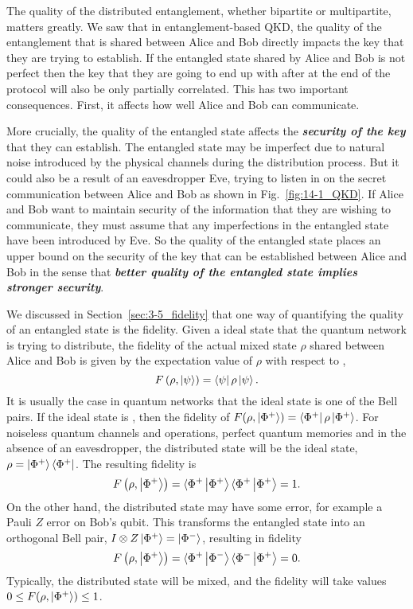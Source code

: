 The quality of the distributed entanglement, whether bipartite or multipartite, matters greatly.
We saw that in entanglement-based QKD, the quality of the entanglement that is shared between Alice and Bob directly impacts the key that they are trying to establish.
If the entangled state shared by Alice and Bob is not perfect then the key that they are going to end up with after at the end of the protocol will also be only partially correlated.
This has two important consequences.
First, it affects how well Alice and Bob can communicate.

More crucially, the quality of the entangled state affects the \textit{\textbf{security of the key}} that they can establish.
The entangled state may be imperfect due to natural noise introduced by the physical channels during the distribution process.
But it could also be a result of an eavesdropper Eve, trying to listen in on the secret communication between Alice and Bob as shown in Fig.~\ref{fig:14-1_QKD}.
If Alice and Bob want to maintain security of the information that they are wishing to communicate, they must assume that any imperfections in the entangled state have been introduced by Eve.
So the quality of the entangled state places an upper bound on the security of the key that can be established between Alice and Bob in the sense that \textit{\textbf{better quality of the entangled state implies stronger security}}.

We discussed in Section~\ref{sec:3-5_fidelity} that one way of quantifying the quality of an entangled state is the fidelity.
Given a ideal state \ket{\psi} that the quantum network is trying to distribute, the fidelity of the actual mixed state $\rho$ shared between Alice and Bob is given by the expectation value of $\rho$ with respect to \ket{\psi},
\begin{equation}
    F \left( \rho, \left| \psi \right\rangle \right) = \left\langle \psi \right|\rho\left| \psi \right\rangle.
\end{equation}
It is usually the case in quantum networks that the ideal state is one of the Bell pairs.
If the ideal state is \ket{\Phi^+}, then the fidelity of $F (\rho, \left| \Phi^+ \right\rangle) = \left\langle \Phi^+ \right|\rho\left| \Phi^+ \right\rangle$.
For noiseless quantum channels and operations, perfect quantum memories and in the absence of an eavesdropper, the distributed state will be the ideal state, $\rho = \left| \Phi^+ \right\rangle\left\langle \Phi^+ \right|$.
The resulting fidelity is
\begin{equation}
    F \left( \rho, \left| \Phi^+ \right\rangle \right) = \langle\Phi^+\left| \Phi^+ \right\rangle \langle\Phi^+\left| \Phi^+ \right\rangle = 1.
\end{equation}
On the other hand, the distributed state may have some error, for example a Pauli $Z$ error on Bob's qubit.
This transforms the entangled state into an orthogonal Bell pair, $I \otimes Z \left| \Phi^+ \right\rangle = \left| \Phi^- \right\rangle$, resulting in fidelity
\begin{equation}
    F \left( \rho, \left| \Phi^+ \right\rangle \right) = \langle\Phi^+\left| \Phi^- \right\rangle \langle\Phi^-\left| \Phi^+ \right\rangle = 0.
    \label{eq:14-1_fidelity_0}
\end{equation}
Typically, the distributed state will be mixed, and the fidelity will take values $ 0 \leq F(\rho, \left| \Phi^+ \right\rangle) \leq 1$.

